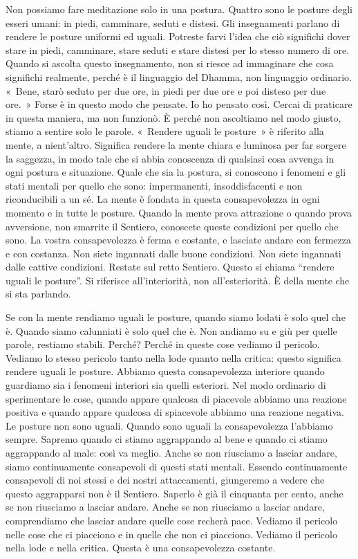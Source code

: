 Non possiamo fare meditazione solo in una postura. Quattro sono le
posture degli esseri umani: in piedi, camminare, seduti e distesi. Gli
insegnamenti parlano di rendere le posture uniformi ed uguali. Potreste
farvi l'idea che ciò significhi dover stare in piedi, camminare, stare
seduti e stare distesi per lo stesso numero di ore. Quando si ascolta
questo insegnamento, non si riesce ad immaginare che cosa significhi
realmente, perché è il linguaggio del Dhamma, non linguaggio ordinario.
«~Bene, starò seduto per due ore, in piedi per due ore e poi disteso per
due ore.~» Forse è in questo modo che pensate. Io ho pensato così.
Cercai di praticare in questa maniera, ma non funzionò. È perché non
ascoltiamo nel modo giusto, stiamo a sentire solo le parole. «~Rendere
uguali le posture~» è riferito alla mente, a nient'altro. Significa
rendere la mente chiara e luminosa per far sorgere la saggezza, in modo
tale che si abbia conoscenza di qualsiasi cosa avvenga in ogni postura e
situazione. Quale che sia la postura, si conoscono i fenomeni e gli
stati mentali per quello che sono: impermanenti, insoddisfacenti e non
riconducibili a un sé. La mente è fondata in questa consapevolezza in
ogni momento e in tutte le posture. Quando la mente prova attrazione o
quando prova avversione, non smarrite il Sentiero, conoscete queste
condizioni per quello che sono. La vostra consapevolezza è ferma e
costante, e lasciate andare con fermezza e con costanza. Non siete
ingannati dalle buone condizioni. Non siete ingannati dalle cattive
condizioni. Restate sul retto Sentiero. Questo si chiama ``rendere
uguali le posture''. Si riferisce all'interiorità, non all'esteriorità.
È della mente che si sta parlando.

Se con la mente rendiamo uguali le posture, quando siamo lodati è solo
quel che è. Quando siamo calunniati è solo quel che è. Non andiamo su e
giù per quelle parole, restiamo stabili. Perché? Perché in queste cose
vediamo il pericolo. Vediamo lo stesso pericolo tanto nella lode quanto
nella critica: questo significa rendere uguali le posture. Abbiamo
questa consapevolezza interiore quando guardiamo sia i fenomeni
interiori sia quelli esteriori. Nel modo ordinario di sperimentare le
cose, quando appare qualcosa di piacevole abbiamo una reazione positiva
e quando appare qualcosa di spiacevole abbiamo una reazione negativa. Le
posture non sono uguali. Quando sono uguali la consapevolezza l'abbiamo
sempre. Sapremo quando ci stiamo aggrappando al bene e quando ci stiamo
aggrappando al male: così va meglio. Anche se non riusciamo a lasciar
andare, siamo continuamente consapevoli di questi stati mentali. Essendo
continuamente consapevoli di noi stessi e dei nostri attaccamenti,
giungeremo a vedere che questo aggrapparsi non è il Sentiero. Saperlo è
già il cinquanta per cento, anche se non riusciamo a lasciar andare.
Anche se non riusciamo a lasciar andare, comprendiamo che lasciar andare
quelle cose recherà pace. Vediamo il pericolo nelle cose che ci
piacciono e in quelle che non ci piacciono. Vediamo il pericolo nella
lode e nella critica. Questa è una consapevolezza costante.

